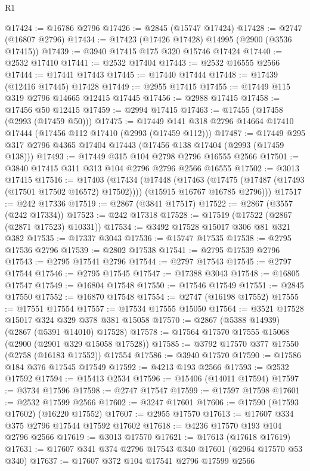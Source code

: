 \begin{lexlean}{R1}
\begin{coremodule}
@17424 := @16786 @2796
@17426 := @2845 (@15747 @17424)
@17428 := @2747 (@16807 @2796)
@17434 := @17423 (@17426 @17428) @14995 (@2900 (@3536 @17415))
@17439 := @3940 @17415 @175 @320 @15746 @17424
@17440 := @2532 @17410
@17441 := @2532 @17404
@17443 := @2532 @16555 @2566
@17444 := @17441 @17443
@17445 := @17440 @17444
@17448 := @17439 (@12416 @17445) @17428
@17449 := @2955 @17415
@17455 := @17449 @115 @319 @2796 @14665 @12415 @17445
@17456 := @2988 @17415
@17458 := @17456 @50 @12415
@17459 := @2994 @17415
@17463 := @17455 (@17458 (@2993 (@17459 @50)))
@17475 := @17449 @141 @318 @2796 @14664 @17410 @17444 (@17456 @112 @17410 (@2993 (@17459 @112)))
@17487 := @17449 @295 @317 @2796 @4365 @17404 @17443 (@17456 @138 @17404 (@2993 (@17459 @138)))
@17493 := @17449 @315 @104 @2798 @2796 @16555 @2566
@17501 := @3840 @17415 @311 @313 @104 @2796 @2796 @2566 @16555
@17502 := @3013 @17415
@17516 := @17403
    (@17434
      (@17448
        (@17463 (@17475 (@17487 (@17493 (@17501 @17502 @16572) @17502))))
        (@15915 @16767 @16785 @2796)))
@17517 := @242 @17336
@17519 := @2867 (@3841 @17517)
@17522 := @2867 (@3557 (@242 @17334))
@17523 := @242 @17318
@17528 := @17519 (@17522 (@2867 (@2871 @17523) @10331))
@17534 := @3492 @17528 @15017 @306 @81 @321 @382
@17535 := @17337 @3043
@17536 := @15747 @17535
@17538 := @2795 @17536 @2796
@17539 := @2802 @17538
@17541 := @2795 @17539 @2796
@17543 := @2795 @17541 @2796
@17544 := @2797 @17543
@17545 := @2797 @17544
@17546 := @2795 @17545
@17547 := @17388 @3043
@17548 := @16805 @17547
@17549 := @16804 @17548
@17550 := @17546 @17549
@17551 := @2845 @17550
@17552 := @16870 @17548
@17554 := @2747 (@16198 @17552)
@17555 := @17551 @17554
@17557 := @17534 @17555 @15050
@17564 := @3521 @17528 @15017 @324 @329 @378 @381 @15058
@17570 := @2867 (@5388 @14939) (@2867 (@5391 @14010) @17528)
@17578 := @17564 @17570 @17555 @15068 (@2900 (@2901 @329 @15058 @17528))
@17585 := @3792 @17570 @377 @17550 (@2758 (@16183 @17552)) @17554
@17586 := @3940 @17570
@17590 := @17586 @184 @376 @17545 @17549
@17592 := @4213 @193 @2566
@17593 := @2532 @17592
@17594 := @15413 @2534
@17596 := @15406 (@14011 @17594)
@17597 := @3734 @17596
@17598 := @2747 @17547
@17599 := @17597 @17598
@17601 := @2532 @17599 @2566
@17602 := @3247 @17601
@17606 := @17590 (@17593 @17602) (@16220 @17552)
@17607 := @2955 @17570
@17613 := @17607 @334 @375 @2796 @17544 @17592 @17602
@17618 := @4236 @17570 @193 @104 @2796 @2566
@17619 := @3013 @17570
@17621 := @17613 (@17618 @17619)
@17631 := @17607 @341 @374 @2796 @17543 @340 @17601 (@2964 @17570 @53 @340)
@17637 := @17607 @372 @104 @17541 @2796 @17599 @2566

\end{coremodule}
\end{lexlean}
